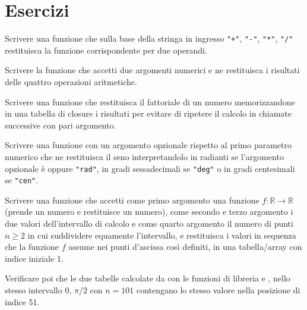 \section{Esercizi}

\begin{Exercise}[label=fn-01]
Scrivere una funzione che sulla base della stringa in ingresso \verb|"+"|,
\verb|"-"|, \verb|"*"|, \verb|"/"| restituisca la funzione corrispondente per
due operandi.
\end{Exercise}

\begin{Exercise}[label=fn-02]
Scrivere la funzione che accetti due argomenti numerici e ne restituisca i
risultati delle quattro operazioni aritmetiche.
\end{Exercise}

\begin{Exercise}[label=fn-03]
Scrivere una funzione che restituisca il fattoriale di un numero memorizzandone
in una tabella di closure i risultati per evitare di ripetere il calcolo in
chiamate successive con pari argomento.
\end{Exercise}

\begin{Exercise}[label=fn-04]
Scrivere una funzione con un argomento opzionale rispetto al primo parametro
numerico che ne restituisca il seno interpretandolo in radianti se l'argomento
opzionale è  oppure \verb|"rad"|, in gradi sessadecimali se
\verb|"deg"| o in gradi centesimali se \verb|"cen"|.
\end{Exercise}

\begin{Exercise}[label=fn-05]
Scrivere una funzione  che accetti come primo argomento una
funzione \( f: ℝ \to ℝ \) (prende un numero e restituisce un numero), come
secondo e terzo argomento i due valori dell'intervallo di calcolo e come quarto
argomento il numero di punti \( n \geq 2 \) in cui suddividere equamente
l'intervallo, e restituisca i valori in sequenza che la funzione \( f \) assume
nei punti d'ascissa così definiti, in una tabella/array con indice iniziale 1.

Verificare poi che le due tabelle calcolate da  con le funzioni di
libreria  e , nello stesso intervallo \( 0 \), \(
\pi/2 \) con \( n = 101 \) contengano lo stesso valore nella posizione di indice
51.
\end{Exercise}


